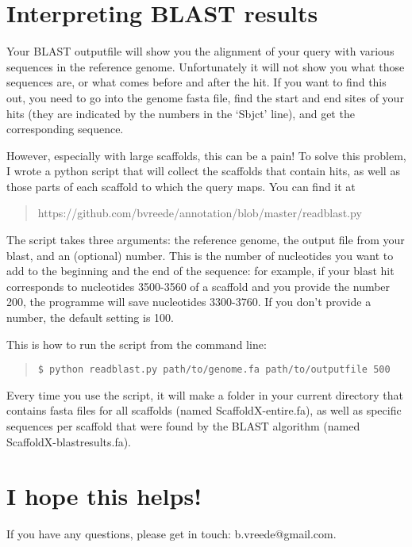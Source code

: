 \documentclass[12pt]{article}
\begin{document}
\section{Interpreting BLAST results}
Your BLAST outputfile will show you the alignment of your query with various sequences in the reference genome. Unfortunately it will not show you what those sequences are, or what comes before and after the hit. If you want to find this out, you need to go into the genome fasta file, find the start and end sites of your hits (they are indicated by the numbers in the `Sbjct' line), and get the corresponding sequence.\par
However, especially with large scaffolds, this can be a pain! To solve this problem, I wrote a python script that will collect the scaffolds that contain hits, as well as those parts of each scaffold to which the query maps. You can find it at
\begin{quote}https://github.com/bvreede/annotation/blob/master/readblast.py
\end{quote}
The script takes three arguments: the reference genome, the output file from your blast, and an (optional) number. This is the number of nucleotides you want to add to the beginning and the end of the sequence: for example, if your blast hit corresponds to nucleotides 3500-3560 of a scaffold and you provide the number 200, the programme will save nucleotides 3300-3760. If you don't provide a number, the default setting is 100.\par
This is how to run the script from the command line:
\begin{quote}
\begin{verbatim}
$ python readblast.py path/to/genome.fa path/to/outputfile 500
\end{verbatim}
\end{quote}
Every time you use the script, it will make a folder in your current directory that contains fasta files for all scaffolds (named ScaffoldX-entire.fa), as well as specific sequences per scaffold that were found by the BLAST algorithm (named ScaffoldX-blastresults.fa).\par
\section*{I hope this helps!}
If you have any questions, please get in touch: b.vreede@gmail.com.
\end{document}
